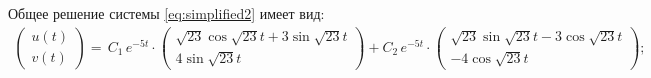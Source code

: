 \documentclass{article}
\begin{document}
Общее решение системы \ref{eq:simplified2} имеет вид: 
\begin{gather*}
\begin{pmatrix}
u(t) \\ v(t)
\end{pmatrix} = \,C_1\,e^{-5t}\cdot 
\begin{pmatrix}
    \sqrt{23}\cos{\sqrt{23}t}+3\sin{\sqrt{23}t} \\ 4\sin{\sqrt{23}t}
\end{pmatrix} + C_2\,e^{-5t}\cdot 
\begin{pmatrix}
    \sqrt{23}\sin{\sqrt{23}t}-3\cos{\sqrt{23}t} \\ -4\cos{\sqrt{23}t}
\end{pmatrix};\\[3pt]
\end{gather*}
\newpage
\end{document}
